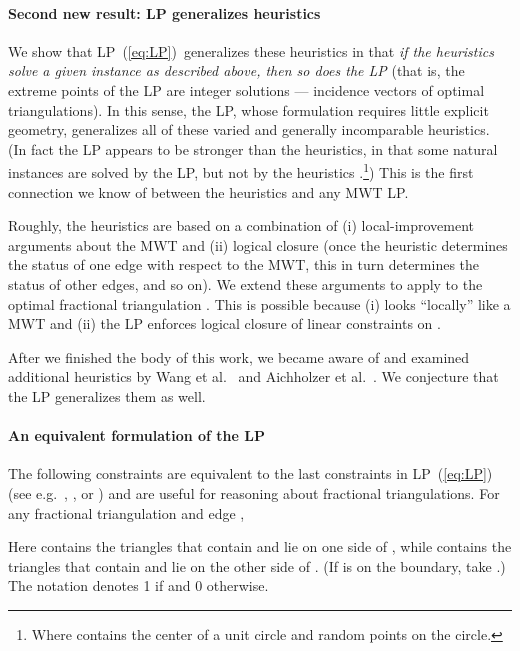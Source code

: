 \documentclass[final]{siamltex}
\newcommand{\refLP}{(\ref{eq:LP})\xspace}
\begin{document}
\paragraph{Second new result: LP generalizes heuristics}
We show that 
LP~\refLP\ generalizes these heuristics
in that {\em if the heuristics solve a given instance
as described above, then so does the LP}
(that is, the extreme points of the LP are integer solutions --- incidence vectors of optimal triangulations).
In this sense, the LP, whose formulation requires little explicit geometry,
generalizes all of these varied and generally incomparable heuristics.
(In fact the LP appears to be stronger than the heuristics, in that some natural instances
are solved by the LP, but not by the heuristics
\cite[\S 3.5]{kirsanov2004minimal}.\footnote
{Where  contains the center of a unit circle and  random points on the circle.})
This is the first connection we know of between the heuristics and any MWT LP.

Roughly, the heuristics are based on a combination of
(i) local-improvement arguments about the MWT and
(ii) logical closure (once the heuristic determines the status of one edge with respect to the MWT,
this in turn determines the status of other edges, and so on).
We extend these arguments to apply to the optimal fractional triangulation .
This is possible because
(i)   looks ``locally'' like a MWT and 
(ii) the LP enforces logical closure of linear constraints on .


After we finished the body of this work, we became aware of
and examined additional heuristics by Wang et al.~\cite{wang1997new} 
and Aichholzer et al.~\cite{aichholzer1996triangulations}.
We conjecture that the LP generalizes them as well.

\paragraph{An equivalent formulation of the LP}
The following constraints are equivalent to the last constraints in LP~\refLP
(see e.g.~\cite[Thm.~1.1(i), Prop.~2.5]{de1996polytope},
\cite{takeuchi1998polytopes}, or \cite[Thm.~3.4.1]{kirsanov2004minimal})
and are useful for reasoning about fractional triangulations.
For any fractional triangulation  and edge ,

Here  contains the triangles that contain  and lie on one side of ,
while  contains the triangles that contain  and lie on the other side of .
(If  is on the boundary, take .)
The notation  denotes 1 if  and 0 otherwise.
\end{document}
